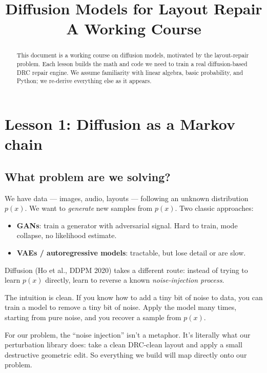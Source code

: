 \documentclass[11pt,a4paper]{article}
\title{\textbf{Diffusion Models for Layout Repair}\\[0.5em]
       \large A Working Course}
\author{}
\date{}
\begin{document}
\maketitle

\begin{abstract}
\noindent
This document is a working course on diffusion models, motivated by
the layout-repair problem. Each lesson builds the math and code we
need to train a real diffusion-based DRC repair engine. We assume
familiarity with linear algebra, basic probability, and Python; we
re-derive everything else as it appears.
\end{abstract}

\tableofcontents
\vspace{1em}

\section{Lesson 1: Diffusion as a Markov chain}

\subsection{What problem are we solving?}

We have data --- images, audio, layouts --- following an unknown
distribution $p(x)$. We want to \emph{generate} new samples from
$p(x)$. Two classic approaches:

\begin{itemize}[leftmargin=*]
\item \textbf{GANs}: train a generator with adversarial signal. Hard to
  train, mode collapse, no likelihood estimate.
\item \textbf{VAEs / autoregressive models}: tractable, but lose detail
  or are slow.
\end{itemize}

Diffusion (Ho et al., DDPM 2020) takes a different route: instead of
trying to learn $p(x)$ directly, learn to reverse a known
\emph{noise-injection process}.

The intuition is clean. If you know how to add a tiny bit of noise to
data, you can train a model to remove a tiny bit of noise. Apply the
model many times, starting from pure noise, and you recover a sample
from $p(x)$.

For our problem, the ``noise injection'' isn't a metaphor. It's
literally what our perturbation library does: take a clean DRC-clean
layout and apply a small destructive geometric edit. So everything we
build will map directly onto our problem.
\end{document}
